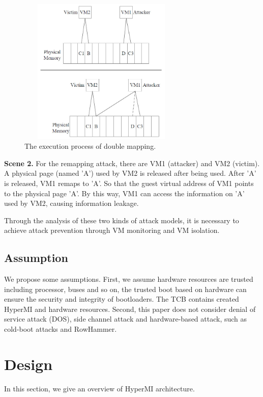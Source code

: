 \documentclass[conference]{IEEEtran}
\begin{document}
\begin{figure}
\centerline{\includegraphics[width=8cm, height=7cm]{VMCS0.jpg}}%
\caption{The execution process of double mapping. } \label{fig0}
\end{figure}

\textbf{Scene 2.}
    For the remapping attack, there are VM1 (attacker) and VM2 (victim). A physical page (named 'A') used by VM2 is released after being used. After 'A' is released, VM1 remaps to 'A'. So that the guest virtual address of VM1 points to the physical page 'A'. By this way, VM1 can access the information on 'A' used by VM2, causing information leakage.

Through the analysis of these two kinds of attack models, it is necessary to achieve attack prevention through VM monitoring and VM isolation.
\subsection{Assumption}

We propose some assumptions.
First, we assume hardware resources are trusted including processor, buses and so on, the trusted boot based on hardware can ensure the security and integrity of bootloaders. The TCB contains created HyperMI and hardware resources. Second, this paper does not consider denial of service attack (DOS), side channel attack and hardware-based attack, such as cold-boot attacks and RowHammer.


\section{Design}\label{sec:design}
In this section, we give an overview of HyperMI architecture.%
\end{document}
